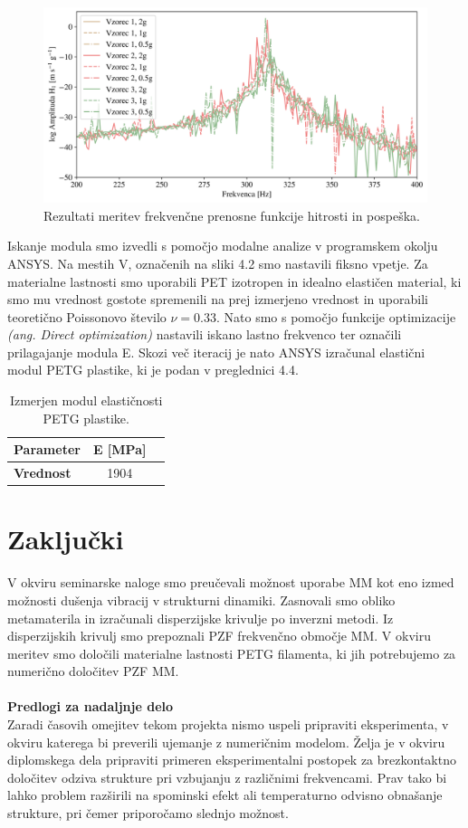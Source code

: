 \documentclass[12pt]{report}
\begin{document}
\begin{figure}[H]
  \centering
  \includegraphics[scale=0.6]{Images/frf.png}
  \caption{Rezultati meritev frekvenčne prenosne funkcije hitrosti in pospeška.}
\end{figure}
\noindent Iskanje modula smo izvedli s pomočjo modalne analize v programskem okolju ANSYS. Na mestih V, označenih na sliki 4.2 smo nastavili fiksno vpetje. Za materialne lastnosti smo uporabili PET izotropen in idealno elastičen material, ki smo mu
vrednost gostote spremenili na prej izmerjeno vrednost in uporabili teoretično Poissonovo število $\nu=0.33$. Nato smo s pomočjo funkcije optimizacije \emph{(ang. Direct optimization)} nastavili iskano lastno frekvenco ter označili prilagajanje modula E. Skozi več iteracij je nato
ANSYS izračunal elastični modul PETG plastike, ki je podan v preglednici 4.4.
\begin{table}[H]
  \caption{Izmerjen modul elastičnosti PETG plastike.}
  \centering
  \begin{tabular}{ | l | c | r | }
    \hline
    \textbf{Parameter} & E [MPa] \\ \hline
    \textbf{Vrednost} & 1904 \\
    \hline  
  \end{tabular}
\end{table}

\chapter{Zaključki}
V okviru seminarske naloge smo preučevali možnost uporabe \ac{MM} kot eno izmed možnosti dušenja vibracij v strukturni dinamiki. 
Zasnovali smo obliko metamaterila in izračunali disperzijske krivulje po inverzni metodi. Iz disperzijskih krivulj smo prepoznali \ac{PZF} frekvenčno
območje \ac{MM}. V okviru meritev smo določili materialne lastnosti PETG filamenta, ki jih potrebujemo za numerično določitev \ac{PZF} \ac{MM}.
\\
\\
\textbf{Predlogi za nadaljnje delo}
\\
Zaradi časovih omejitev tekom projekta nismo uspeli pripraviti eksperimenta, v okviru katerega bi preverili ujemanje z numeričnim modelom. Želja je v okviru diplomskega dela 
pripraviti primeren eksperimentalni postopek za brezkontaktno določitev odziva strukture pri vzbujanju z različnimi frekvencami. Prav tako bi lahko problem razširili na spominski efekt ali temperaturno odvisno obnašanje strukture, pri čemer priporočamo slednjo
možnost.


\printbibliography[heading=bibnumbered]
\end{document}
